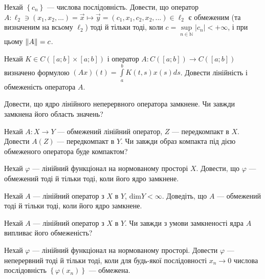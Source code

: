 \begin{exercise}
    Нехай $\left\{c_n\right\}$ --- числова послідовність. Довести, що оператор
    $A : \ell_2 \ni (x_1, x_2, ...) = \vec{x} \mapsto \vec{y} = (c_1, x_1, c_2, x_2, ...) \in \ell_2$
    є обмеженим (та визначеним на всьому $\ell_2$) тоді й тільки тоді, коли $c = \underset{n\in\mathbb{N}}{\sup} |c_n| < +\infty$, 
    і при цьому $\left\lVert A\right\rVert = c$.
\end{exercise}

\begin{exercise}
    Нехай $K \in C\left( [a;b] \times [a;b]\right)$ і оператор $A: C\left( [a;b]\right) \rightarrow C\left( [a;b]\right)$
    визначено формулою $(Ax)(t) = \int\limits_a^b K(t, s) x(s) ds$. Довести лінійність і обмеженість оператора $A$.
\end{exercise}

\begin{exercise}
    Довести, що ядро лінійного неперервного оператора замкнене. Чи завжди замкнена його область значень?
\end{exercise}

\begin{exercise}
    Нехай $A: X \rightarrow Y$ --- обмежений лінійний оператор, $Z$ --- передкомпакт в $X$.
    Довести $A(Z)$ --- передкомпакт в $Y$. Чи завжди образ компакта під дією обмеженого оператора буде компактом?
\end{exercise}

\begin{exercise}
    Нехай $\varphi$ --- лінійний функціонал на нормованому просторі $X$. 
    Довести, що $\varphi$ --- обмежений тоді й тільки тоді, коли його ядро замкнене. 
\end{exercise}

\begin{exercise}
    Нехай $A$ --- лінійний оператор з $X$ в $Y$, $\mathrm{dim} Y < \infty$.
    Доведіть, що $A$ --- обмежений тоді й тільки тоді, коли його ядро замкнене.
\end{exercise}

\begin{exercise}
    Нехай $A$ --- лінійний оператор з $X$ в $Y$. Чи завжди з умови замкненості ядра $A$ випливає його обмеженість?
\end{exercise}

\begin{exercise}
    Нехай $\varphi$ --- лінійний функціонал на нормованому просторі. Довести $\varphi$ --- неперервний тоді й тільки тоді, коли
    для будь-якої послідовності $x_n \rightarrow 0$ числова послідовність $\left\{\varphi(x_n)\right\}$ --- обмежена.
\end{exercise}

